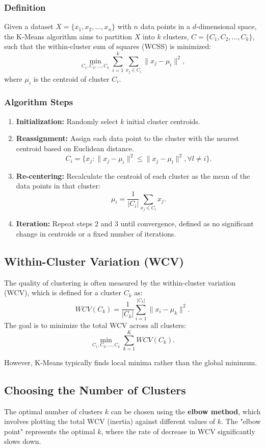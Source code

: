 \documentclass[12pt,a4paper]{article}
\begin{document}
\subsubsection{Definition}
Given a dataset \(X = \{x_1, x_2, \ldots, x_n\}\) with \(n\) data points in a \(d\)-dimensional space, the K-Means algorithm aims to partition \(X\) into \(k\) clusters, \(C = \{C_1, C_2, \ldots, C_k\}\), such that the within-cluster sum of squares (WCSS) is minimized:
\[
\min_{C_1, C_2, \ldots, C_k} \sum_{i=1}^k \sum_{x_j \in C_i} \|x_j - \mu_i\|^2,
\]
where \(\mu_i\) is the centroid of cluster \(C_i\).

\subsubsection{Algorithm Steps}
\begin{enumerate}
    \item \textbf{Initialization:} Randomly select \(k\) initial cluster centroids.
    \item \textbf{Reassignment:} Assign each data point to the cluster with the nearest centroid based on Euclidean distance.
    \[
    C_i = \{x_j : \|x_j - \mu_i\|^2 \leq \|x_j - \mu_l\|^2, \forall l \neq i\}.
    \]
    \item \textbf{Re-centering:} Recalculate the centroid of each cluster as the mean of the data points in that cluster:
    \[
    \mu_i = \frac{1}{|C_i|} \sum_{x_j \in C_i} x_j.
    \]
    \item \textbf{Iteration:} Repeat steps 2 and 3 until convergence, defined as no significant change in centroids or a fixed number of iterations.
\end{enumerate}

\subsection{Within-Cluster Variation (WCV)}
The quality of clustering is often measured by the within-cluster variation (WCV), which is defined for a cluster \(C_k\) as:
\[
WCV(C_k) = \frac{1}{|C_k|} \sum_{i=1}^{|C_k|} \|x_i - \mu_k\|^2.
\]
The goal is to minimize the total WCV across all clusters:
\[
\min_{C_1, C_2, \ldots, C_k} \sum_{k=1}^K WCV(C_k).
\]

However, K-Means typically finds local minima rather than the global minimum.

\subsection{Choosing the Number of Clusters}
The optimal number of clusters \(k\) can be chosen using the \textbf{elbow method}, which involves plotting the total WCV (inertia) against different values of \(k\). The "elbow point" represents the optimal \(k\), where the rate of decrease in WCV significantly slows down.
\end{document}
